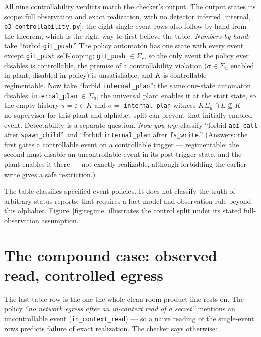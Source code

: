 \documentclass[11pt,a4paper]{article}  \usepackage{mdframed} \usepackage{graphicx} \usepackage{tabularx}
\begin{document}
\noindent All nine controllability verdicts match the checker's output. The output states its scope: full observation and exact realization, with no detector inferred [internal, \texttt{b3\_\allowbreak controllability.py}]; the
eight single-event rows also follow by hand from the theorem, which is the right way to first believe the table.
\emph{Numbers by hand:} take ``forbid \texttt{git\_\allowbreak push}.'' The policy automaton has one state with every event except
\texttt{git\_\allowbreak push} self-looping; \texttt{git\_\allowbreak push}$\;\in\Sigma_c$, so the only event the policy ever disables is
controllable, the premise of a controllability violation ($\sigma\in\Sigma_u$ enabled in plant, disabled in policy) is
unsatisfiable, and $K$ is controllable --- regimentable. Now take ``forbid \texttt{internal\_\allowbreak plan}'': the same one-state
automaton disables \texttt{internal\_\allowbreak plan}$\;\in\Sigma_u$, the universal plant enables it at the start state, so the empty
history $s=\varepsilon\in\overline{K}$ and $\sigma=$ \texttt{internal\_\allowbreak plan} witness
$\overline{K}\Sigma_u\cap\overline{L}\not\subseteq\overline{K}$ --- no supervisor for this plant and alphabet split can prevent that initially enabled event. Detectability is a separate question. \emph{Now you try:} classify ``forbid \texttt{api\_\allowbreak call} after \texttt{spawn\_\allowbreak child}'' and ``forbid
\texttt{internal\_\allowbreak plan} after \texttt{fs\_\allowbreak write}.'' (Answers: the first gates a controllable event on a controllable trigger
--- regimentable; the second must disable an uncontrollable event in its post-trigger state, and the plant enables it there
--- not exactly realizable, although forbidding the earlier write gives a safe restriction.)

The table classifies specified event policies. It does not classify the
truth of arbitrary status reports: that requires a fact model and observation
rule beyond this alphabet. Figure~\ref{fig:regime} illustrates the control
split under its stated full-observation assumption.


\section{The compound case: observed read, controlled egress}\label{sec:compound} The last table row is the one the whole
clean-room product line rests on. The policy \emph{``no network egress after an in-context read of a secret''} mentions an
uncontrollable event (\texttt{in\_\allowbreak context\_\allowbreak read}) --- so a naive reading of the single-event rows predicts failure of exact realization. The
checker says otherwise:
\end{document}
